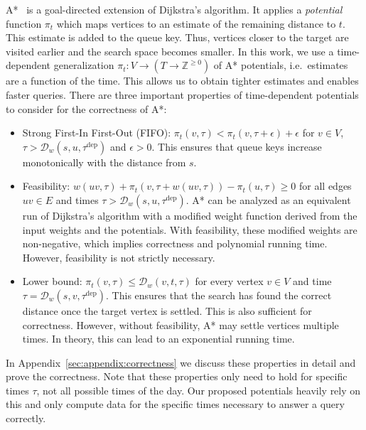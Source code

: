 \documentclass[a4paper,UKenglish,cleveref, autoref, thm-restate,anonymous]{lipics-v2021}
\newcommand*{\dist}{\mathcal{D}}
\newcommand*{\tdep}{\tau^{\operatorname{dep}}}
\begin{document}
A*~\cite{hnr-afbhd-68} is a goal-directed extension of Dijkstra's algorithm.
It applies a \emph{potential} function $\pi_t$ which maps vertices to an estimate of the remaining distance to $t$.
This estimate is added to the queue key.
Thus, vertices closer to the target are visited earlier and the search space becomes smaller.
%
In this work, we use a time-dependent generalization $\pi_t : V \to (T \to \mathbb{Z}^{\geq 0})$ of A* potentials, i.e.\ estimates are a function of the time.
This allows us to obtain tighter estimates and enables faster queries.
There are three important properties of time-dependent potentials to consider for the correctness of A*:

\begin{itemize}
  \item Strong First-In First-Out (FIFO): $\pi_t(v, \tau) < \pi_t(v, \tau + \epsilon) + \epsilon$ for $v \in V$, $\tau > \dist_w(s,u,\tdep)$ and $\epsilon > 0$.
        This ensures that queue keys increase monotonically with the distance from $s$.
  \item Feasibility: $w(uv, \tau) + \pi_t(v, \tau + w(uv, \tau)) - \pi_t(u, \tau) \geq 0$ for all edges $uv \in E$ and times $\tau > \dist_w(s,u,\tdep)$.
        A* can be analyzed as an equivalent run of Dijkstra's algorithm with a modified weight function derived from the input weights and the potentials.
        With feasibility, these modified weights are non-negative, which implies correctness and polynomial running time.
        However, feasibility is not strictly necessary.
  \item Lower bound: $\pi_t(v, \tau) \leq \dist_w(v,t,\tau)$ for every vertex $v \in V$ and time $\tau = \dist_w(s,v,\tdep)$.
        This ensures that the search has found the correct distance once the target vertex is settled.
        This is also sufficient for correctness.
        However, without feasibility, A* may settle vertices multiple times.
        In theory, this can lead to an exponential running time.
\end{itemize}

In Appendix~\ref{sec:appendix:correctness} we discuss these properties in detail and prove the correctness.
Note that these properties only need to hold for specific times $\tau$, not all possible times of the day.
Our proposed potentials heavily rely on this and only compute data for the specific times necessary to answer a query correctly.
\end{document}

